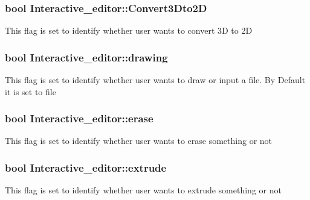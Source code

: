 \subsubsection[{\texorpdfstring{Convert3\+Dto2D}{Convert3Dto2D}}]{\setlength{\rightskip}{0pt plus 5cm}bool Interactive\+\_\+editor\+::\+Convert3\+Dto2D}\hypertarget{classInteractive__editor_a83829cee0dd00c90dbb841abde5596a4}{}\label{classInteractive__editor_a83829cee0dd00c90dbb841abde5596a4}
This flag is set to identify whether user wants to convert 3D to 2D 
\subsubsection[{\texorpdfstring{drawing}{drawing}}]{\setlength{\rightskip}{0pt plus 5cm}bool Interactive\+\_\+editor\+::drawing}\hypertarget{classInteractive__editor_ace62b483a0866c64212ee0c641445c7a}{}\label{classInteractive__editor_ace62b483a0866c64212ee0c641445c7a}
This flag is set to identify whether user wants to draw or input a file. By Default it is set to file 
\subsubsection[{\texorpdfstring{erase}{erase}}]{\setlength{\rightskip}{0pt plus 5cm}bool Interactive\+\_\+editor\+::erase}\hypertarget{classInteractive__editor_ac2f2f1dfb6c21585d4ed5ed043e41b25}{}\label{classInteractive__editor_ac2f2f1dfb6c21585d4ed5ed043e41b25}
This flag is set to identify whether user wants to erase something or not 
\subsubsection[{\texorpdfstring{extrude}{extrude}}]{\setlength{\rightskip}{0pt plus 5cm}bool Interactive\+\_\+editor\+::extrude}\hypertarget{classInteractive__editor_a3e4db48e715e92969ba3ec52ab14ce8d}{}\label{classInteractive__editor_a3e4db48e715e92969ba3ec52ab14ce8d}
This flag is set to identify whether user wants to extrude something or not 
